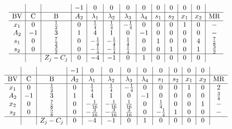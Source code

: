 \documentclass{article}
\begin{document}
\begin{align*}
\begin{array}{c|c|c|c|c|c|c|c|c|c|c|c|c}
 &  &  & -1 & 0 & 0 & 0 & 0 & 0 & 0 & 0 & 0 & \\
\hline
\text{BV} & \text{C} & \text{B} & A_{2} & \lambda_{1} & \lambda_{2} & \lambda_{3} & \lambda_{4} & s_{1} & s_{2} & x_{1} & x_{2} & \text{MR} \\
\hline
x_{1} & 0 & \frac{1}{2} & 0 & \frac{1}{4} & \frac{1}{4} & -\frac{1}{4} & 0 & 0 & 0 & 1 & 0 & - \\
A_{2} & -1 & 3 & 1 & 4 & 1 & 0 & -1 & 0 & 0 & 0 & 0 & - \\
s_{1} & 0 & \frac{7}{2} & 0 & -\frac{1}{4} & -\frac{1}{4} & \frac{1}{4} & 0 & 1 & 0 & 0 & 4 & \frac{7}{8} \\
s_{2} & 0 & \frac{3}{2} & 0 & -\frac{1}{4} & -\frac{1}{4} & \frac{1}{4} & 0 & 0 & 1 & 0 & 1 & \frac{3}{2} \\
\hline
 &  & Z_j-C_j & 0 & -4 & -1 & 0 & 1 & 0 & 0 & 0 & 0 & \\
\end{array}
\end{align*}
\begin{align*}
\begin{array}{c|c|c|c|c|c|c|c|c|c|c|c|c}
 &  &  & -1 & 0 & 0 & 0 & 0 & 0 & 0 & 0 & 0 & \\
\hline
\text{BV} & \text{C} & \text{B} & A_{2} & \lambda_{1} & \lambda_{2} & \lambda_{3} & \lambda_{4} & s_{1} & s_{2} & x_{1} & x_{2} & \text{MR} \\
\hline
x_{1} & 0 & \frac{1}{2} & 0 & \frac{1}{4} & \frac{1}{4} & -\frac{1}{4} & 0 & 0 & 0 & 1 & 0 & 2 \\
A_{2} & -1 & 3 & 1 & 4 & 1 & 0 & -1 & 0 & 0 & 0 & 0 & \frac{3}{4} \\
x_{2} & 0 & \frac{7}{8} & 0 & -\frac{1}{16} & -\frac{1}{16} & \frac{1}{16} & 0 & \frac{1}{4} & 0 & 0 & 1 & - \\
s_{2} & 0 & \frac{5}{8} & 0 & -\frac{3}{16} & -\frac{3}{16} & \frac{3}{16} & 0 & -\frac{1}{4} & 1 & 0 & 0 & - \\
\hline
 &  & Z_j-C_j & 0 & -4 & -1 & 0 & 1 & 0 & 0 & 0 & 0 & \\
\end{array}
\end{align*}
\end{document}
